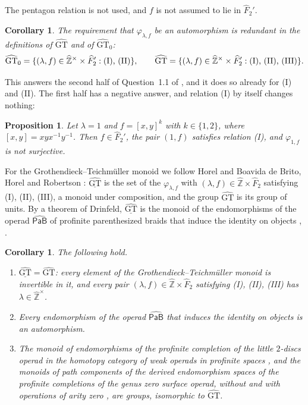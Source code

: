 \documentclass[11pt]{amsart}
\newtheorem{corollaryx}[theorem]{Corollary}
\newtheorem{propositionx}[theorem]{Proposition}
\theoremstyle{definition}
\theoremstyle{remark}
\newcommand{\Zh}{\widehat{\mathbb Z}}
\newcommand{\Fh}{\widehat F}
\newcommand{\GT}{\widehat{\mathrm{GT}}}
\newcommand{\GTz}{\widehat{\mathrm{GT}}_0}
\newcommand{\GTm}{\underline{\widehat{\mathrm{GT}}}}
\newcommand{\PaBh}{\widehat{\mathsf{PaB}}}
\newcommand{\ph}{\varphi}
\begin{document}
The pentagon relation is not used, and $f$ is not assumed to lie in $\Fh_2'$.

\begin{corollaryx}\label{corB}
The requirement that $\ph_{\lambda,f}$ be an automorphism is redundant in the definitions of $\GT$ and of $\GTz$:
\[
 \GTz=\{(\lambda,f)\in\Zh^\times\times\Fh_2' : \textup{(I), (II)}\},\qquad
 \GT=\{(\lambda,f)\in\Zh^\times\times\Fh_2' : \textup{(I), (II), (III)}\}.
\]
\end{corollaryx}

This answers the second half of Question~1.1 of \cite{LS}, and it does so already for (I) and (II). The first half has a negative answer, and relation (I) by itself changes nothing:

\begin{propositionx}\label{propC}
Let $\lambda=1$ and $f=[x,y]^k$ with $k\in\{1,2\}$, where $[x,y]=xyx^{-1}y^{-1}$. Then $f\in\Fh_2'$, the pair $(1,f)$ satisfies relation \textup{(I)}, and $\ph_{1,f}$ is not surjective.
\end{propositionx}

For the Grothendieck--Teichm\"uller monoid we follow Horel \cite[Definition~7.1]{Hor} and Boavida de Brito, Horel and Robertson \cite[Definition~7.2]{BHR}: $\GTm$ is the set of the $\ph_{\lambda,f}$ with $(\lambda,f)\in\Zh\times\Fh_2$ satisfying (I), (II), (III), a monoid under composition, and the group $\GT$ is its group of units. By a theorem of Drinfeld, $\GTm$ is the monoid of the endomorphisms of the operad $\PaBh$ of profinite parenthesized braids that induce the identity on objects \cite[Theorem~7.2]{Hor}, \cite[Proposition~7.3]{BHR}.

\begin{corollaryx}\label{corD}
The following hold.
\begin{enumerate}
\item[(a)] $\GTm=\GT$: every element of the Grothendieck--Teichm\"uller monoid is invertible in it, and every pair $(\lambda,f)\in\Zh\times\Fh_2$ satisfying \textup{(I), (II), (III)} has $\lambda\in\Zh^\times$.
\item[(b)] Every endomorphism of the operad $\PaBh$ that induces the identity on objects is an automorphism.
\item[(c)] The monoid of endomorphisms of the profinite completion of the little $2$-discs operad in the homotopy category of weak operads in profinite spaces \cite[Theorem~8.4]{Hor}, and the monoids of path components of the derived endomorphism spaces of the profinite completions of the genus zero surface operad, without and with operations of arity zero \cite[Theorems~8.4 and~11.1]{BHR}, are groups, isomorphic to $\GT$.
\end{enumerate}
\end{corollaryx}
\end{document}
